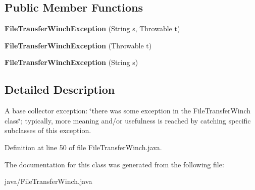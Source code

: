 \subsection*{Public Member Functions}
\begin{DoxyCompactItemize}
\item 
{\bfseries File\+Transfer\+Winch\+Exception} (String s, Throwable t)\label{classorg_1_1smallfoot_1_1filexfer_1_1FileTransferWinch_1_1FileTransferWinchException_abf4a7354f578a7ff2783d7259d4a35c1}

\item 
{\bfseries File\+Transfer\+Winch\+Exception} (Throwable t)\label{classorg_1_1smallfoot_1_1filexfer_1_1FileTransferWinch_1_1FileTransferWinchException_a24d32d742afc2eb515a707f9086ae9a6}

\item 
{\bfseries File\+Transfer\+Winch\+Exception} (String s)\label{classorg_1_1smallfoot_1_1filexfer_1_1FileTransferWinch_1_1FileTransferWinchException_a28313c0c520cd234b6ccc2fafa72f8e5}

\end{DoxyCompactItemize}


\subsection{Detailed Description}
A base collector exception\+: \char`\"{}there was some exception in the File\+Transfer\+Winch class\char`\"{}; typically, more meaning and/or usefulness is reached by catching specific subclasses of this exception. 

Definition at line 50 of file File\+Transfer\+Winch.\+java.



The documentation for this class was generated from the following file\+:\begin{DoxyCompactItemize}
\item 
java/File\+Transfer\+Winch.\+java\end{DoxyCompactItemize}
